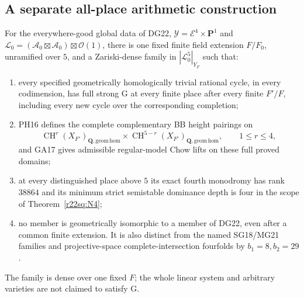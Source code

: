 \subsection{A separate all-place arithmetic construction}

\begin{theorem}
\label{r22sq:global}
For the everywhere-good global data of DG22,
$\mathcal Y=\mathcal E^4\times\mathbf P^1$ and
$\mathcal L_0=(\mathcal A_0\boxtimes\mathcal A_0)
\boxtimes\mathcal O(1)$, there is one fixed finite field
extension $F/F_0$, unramified over $5$, and a Zariski-dense
family in $|\mathcal L_0^5|_{Y_F}$ such that:
\begin{enumerate}
\item every specified geometrically homologically trivial
rational cycle, in every codimension, has full strong G
at every finite place after every finite $F'/F$, including
every new cycle over the corresponding completion;
\item PH16 defines the complete complementary BB height
pairings on
\[
 \operatorname{CH}^r(X_{F'})_{\mathbf Q,\mathrm{geom\,hom}}
 \times\operatorname{CH}^{5-r}(X_{F'})_{\mathbf Q,\mathrm{geom\,hom}},
                         \qquad1\le r\le4,
 \tag{SQ22.11}\label{r22sq:height}
\]
and GA17 gives admissible regular-model Chow lifts on
these full proved domains;
\item at every distinguished place above $5$ its exact
fourth monodromy has rank $38864$ and its minimum strict
semistable dominance depth is four in the scope of
Theorem~\ref{r22sq:N4};
\item no member is geometrically isomorphic to a member
of DG22, even after a common finite extension.  It is
also distinct from the named SG18/MG21 families and
projective-space complete-intersection fourfolds by
$b_1=8,b_2=29$.
\end{enumerate}
The family is dense over one fixed $F$; the whole linear
system and arbitrary varieties are not claimed to satisfy G.
\end{theorem}

